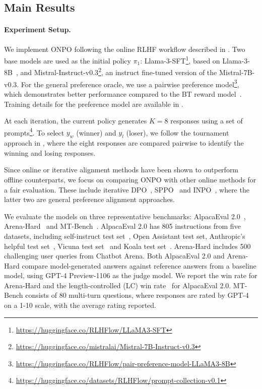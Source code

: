 \subsection{Main Results} \paragraph{Experiment Setup.} We implement ONPO following the online RLHF workflow described in \citet{dong2024rlhf}. Two base models are used as the initial policy $\pi_1$: Llama-3-SFT\footnote{\url{https://huggingface.co/RLHFlow/LLaMA3-SFT}}, based on Llama-3-8B~\citep{dubey2024llama}, and Mistral-Instruct-v0.3\footnote{\url{https://huggingface.co/mistralai/Mistral-7B-Instruct-v0.3}}, an instruct fine-tuned version of the Mistral-7B-v0.3. For the general preference oracle, we use a pairwise preference model\footnote{\url{https://huggingface.co/RLHFlow/pair-preference-model-LLaMA3-8B}}, which demonstrates better performance compared to the BT reward model~\citep{zhang2024iterative}. Training details for the preference model are available in \citet{dong2024rlhf}.

At each iteration, the current policy generates $K = 8$ responses using a set of prompts\footnote{\url{https://huggingface.co/datasets/RLHFlow/prompt-collection-v0.1}}. To select $y_w$ (winner) and $y_l$ (loser), we follow the tournament approach in \citet{zhang2024iterative}, where the eight responses are compared pairwise to identify the winning and losing responses.

Since online or iterative alignment methods have been shown to outperform offline counterparts, we focus on comparing ONPO with other online methods for a fair evaluation. These include iterative DPO~\citep{dong2024rlhf}, SPPO~\citep{wu2024self} and INPO~\citep{zhang2024iterative}, where the latter two are general preference alignment approaches.

We evaluate the models on three representative benchmarks: AlpacaEval 2.0~\citep{li2023alpacaeval}, Arena-Hard~\citep{li2024live} and MT-Bench~\citep{zheng2024judging}. AlpacaEval 2.0 has 805 instructions from five datasets, including self-instruct test set~\citep{wang2022self}, Open Assistant test set, Anthropic's helpful test set~\citep{bai2022training}, Vicuna test set~\citep{zheng2024judging} and Koala test set~\citep{koala_blogpost_2023}. Arena-Hard includes 500 challenging user queries from Chatbot Arena. Both AlpacaEval 2.0 and Arena-Hard compare model-generated answers against reference answers from a baseline model, using GPT-4 Preview-1106 as the judge model. We report the win rate for Arena-Hard and the length-controlled (LC) win rate~\citep{dubois2024length} for AlpacaEval 2.0. MT-Bench consists of 80 multi-turn questions, where responses are rated by GPT-4 on a 1-10 scale, with the average rating reported.

